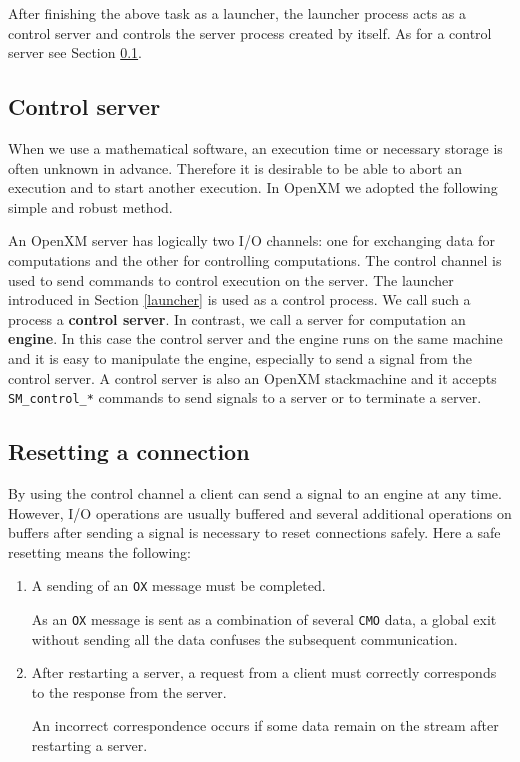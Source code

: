 After finishing the above task as a launcher, the launcher process
acts as a control server and controls the server process created by
itself. As for a control server see Section \ref{control}.

\subsection{Control server}
\label{control}
When we use a mathematical software, an execution time or necessary
storage is often unknown in advance. Therefore it is desirable
to be able to abort an execution and to start another execution.
In OpenXM we adopted the following simple and robust method.

An OpenXM server has logically two I/O channels: one for exchanging
data for computations and the other for controlling computations. The
control channel is used to send commands to control execution on the
server. The launcher introduced in Section \ref{launcher}
is used as a control process. We call such a process a {\bf
control server}. In contrast, we call a server for computation an {\bf
engine}. In this case the control server and the engine runs on the
same machine and it is easy to manipulate the engine, especially to
send a signal from the control server. A control server is also an
OpenXM stackmachine and it accepts {\tt SM\_control\_*} commands
to send signals to a server or to terminate a server.

\subsection{Resetting a connection}

By using the control channel a client can send a signal to an engine
at any time. However, I/O operations are usually buffered and several
additional operations on buffers after sending a signal is necessary
to reset connections safely. Here a safe resetting means the
following:

\begin{enumerate}
\item A sending of an {\tt OX} message must be completed.

As an {\tt OX} message is sent as a combination of several {\tt CMO}
data, a global exit without sending all the data confuses the
subsequent communication.

\item After restarting a server, a request from a client 
must correctly corresponds to the response from the server.

An incorrect correspondence occurs if some data remain on the stream
after restarting a server.
\end{enumerate}

